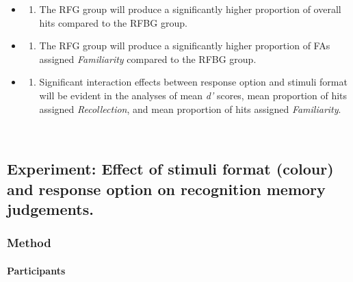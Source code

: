 \documentclass[
  11pt,
]{article}
\providecommand{\tightlist}{%
  \setlength{\itemsep}{0pt}\setlength{\parskip}{0pt}}
\begin{document}
\begin{enumerate}
  \begin{itemize}
  \item
    \begin{enumerate}
    \def\labelenumii{\roman{enumii})}
    \tightlist
    \item
      The RFG group will produce a significantly higher proportion of
      overall hits compared to the RFBG group.
    \end{enumerate}
  \item
    \begin{enumerate}
    \def\labelenumii{\roman{enumii})}
    \setcounter{enumii}{1}
    \tightlist
    \item
      The RFG group will produce a significantly higher proportion of
      FAs assigned \emph{Familiarity} compared to the RFBG group.
    \end{enumerate}
  \item
    \begin{enumerate}
    \def\labelenumii{\roman{enumii})}
    \setcounter{enumii}{2}
    \tightlist
    \item
      Significant interaction effects between response option and
      stimuli format will be evident in the analyses of mean \emph{d'}
      scores, mean proportion of hits assigned \emph{Recollection}, and
      mean proportion of hits assigned \emph{Familiarity}.
    \end{enumerate}
  \end{itemize}
\end{enumerate}

~~

\hypertarget{experiment-effect-of-stimuli-format-colour-and-response-option-on-recognition-memory-judgements.}{%
\subsection{Experiment: Effect of stimuli format (colour) and response
option on recognition memory
judgements.}\label{experiment-effect-of-stimuli-format-colour-and-response-option-on-recognition-memory-judgements.}}

\hypertarget{method-3}{%
\subsubsection{Method}\label{method-3}}

\hypertarget{participants-3}{%
\paragraph{Participants}\label{participants-3}}
\end{document}
